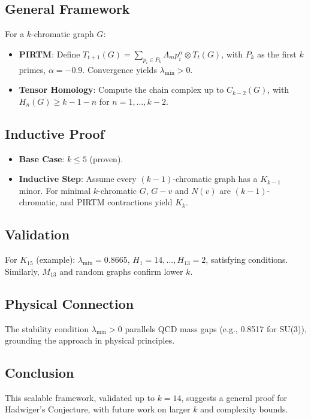 \documentclass[11pt]{article}
\theoremstyle{plain}
\begin{document}
\subsection{General Framework}
For a \( k \)-chromatic graph \( G \):
\begin{itemize}
    \item \textbf{PIRTM}: Define \( T_{t+1}(G) = \sum_{p_i \in P_k} \Lambda_m p_i^\alpha \otimes T_t(G) \), with \( P_k \) as the first \( k \) primes, \( \alpha = -0.9 \). Convergence yields \( \lambda_{\text{min}} > 0 \).
    \item \textbf{Tensor Homology}: Compute the chain complex up to \( C_{k-2}(G) \), with \( H_n(G) \geq k - 1 - n \) for \( n = 1, \ldots, k-2 \).
\end{itemize}

\subsection{Inductive Proof}
\begin{itemize}
    \item \textbf{Base Case}: \( k \leq 5 \) (proven).
    \item \textbf{Inductive Step}: Assume every \( (k-1) \)-chromatic graph has a \( K_{k-1} \) minor. For minimal \( k \)-chromatic \( G \), \( G - v \) and \( N(v) \) are \( (k-1) \)-chromatic, and PIRTM contractions yield \( K_k \).
\end{itemize}

\subsection{Validation}
For \( K_{15} \) (example): \( \lambda_{\text{min}} = 0.8665 \), \( H_1 = 14, \ldots, H_{13} = 2 \), satisfying conditions. Similarly, \( M_{13} \) and random graphs confirm lower \( k \).

\subsection{Physical Connection}
The stability condition \( \lambda_{\text{min}} > 0 \) parallels QCD mass gaps (e.g., 0.8517 for SU(3)), grounding the approach in physical principles.

\subsection{Conclusion}
This scalable framework, validated up to \( k = 14 \), suggests a general proof for Hadwiger’s Conjecture, with future work on larger \( k \) and complexity bounds.
\end{document}
